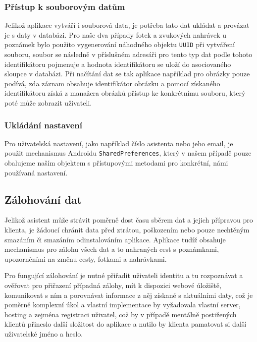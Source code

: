 \documentclass[czech,master,public,dept460,male,java,cpdeclaration]{diploma}
\begin{document}
\subsubsection{Přístup k souborovým datům}
Jelikož aplikace vytváří i souborová data, je potřeba tato dat ukládat a provázat je s daty v databázi.
Pro naše dva případy fotek a zvukových nahrávek u poznámek bylo použito vygenerování náhodného
objektu \texttt{UUID} při vytváření souboru, soubor se následně v příslušném adresáři pro tento typ
dat podle tohoto identifikátoru pojmenuje a hodnota identifikátoru se uloží do asociovaného sloupce
v databázi. Při načítání dat se tak aplikace například pro obrázky pouze podívá, zda záznam obsahuje
identifikátor obrázku a pomocí získaného identifikátoru získá z manažera obrázků přístup ke konkrétnímu
souboru, který poté může zobrazit uživateli.

\subsubsection{Ukládání nastavení}
Pro uživatelská nastavení, jako například číslo asistenta nebo jeho email, je použit mechanismus Androidu
\texttt{SharedPreferences}, který v našem případě pouze obalujeme naším objektem s přístupovými
metodami pro konkrétní, námi používaná nastavení.


\subsection{Zálohování dat}
Jelikož asistent může strávit poměrně dost času sběrem dat a jejich přípravou pro klienta, je žádoucí chránit data před ztrátou,
poškozením nebo pouze nechtěným smazáním či smazáním odinstalováním aplikace. Aplikace tudíž obsahuje mechanismus pro zálohu všech
dat a to nahraných cest s poznámkami, upozorněními na změnu cesty, fotkami a nahrávkami.

Pro fungující zálohování je nutné přiřadit uživateli identitu a tu rozpoznávat a ověřovat pro přiřazení případná zálohy,
mít k dispozici webové úložiště, komunikovat s ním a porovnávat informace z něj získané s aktuálními daty,
což je poměrně komplexní úkol a vlastní implementace by
vyžadovala vlastní server, hosting a zejména registraci uživatel, což by v případě mentálně postižených klientů
přineslo další složitost do aplikace a nutilo by klienta pamatovat si další uživatelské jméno a heslo.
\end{document}

